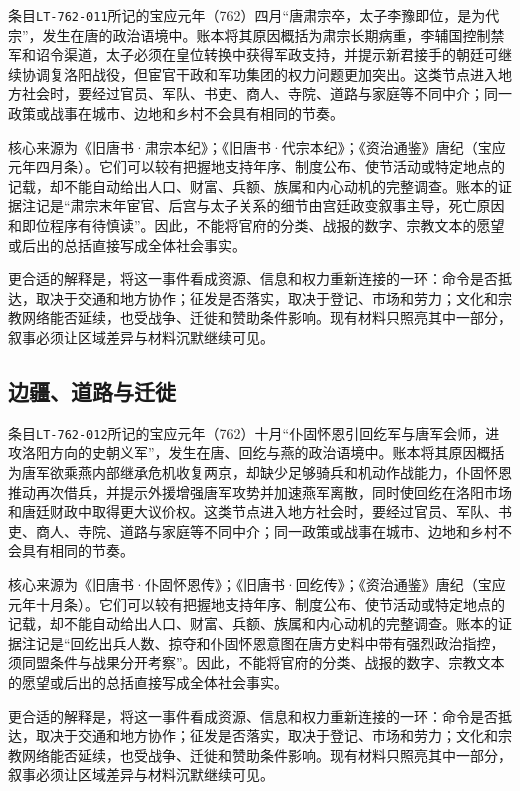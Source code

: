条目\texttt{LT-762-011}所记的宝应元年（762）四月“唐肃宗卒，太子李豫即位，是为代宗”，发生在唐的政治语境中。账本将其原因概括为肃宗长期病重，李辅国控制禁军和诏令渠道，太子必须在皇位转换中获得军政支持，并提示新君接手的朝廷可继续协调复洛阳战役，但宦官干政和军功集团的权力问题更加突出。这类节点进入地方社会时，要经过官员、军队、书吏、商人、寺院、道路与家庭等不同中介；同一政策或战事在城市、边地和乡村不会具有相同的节奏。

核心来源为《旧唐书·肃宗本纪》；《旧唐书·代宗本纪》；《资治通鉴》唐纪（宝应元年四月条）。它们可以较有把握地支持年序、制度公布、使节活动或特定地点的记载，却不能自动给出人口、财富、兵额、族属和内心动机的完整调查。账本的证据注记是“肃宗末年宦官、后宫与太子关系的细节由宫廷政变叙事主导，死亡原因和即位程序有待慎读”。因此，不能将官府的分类、战报的数字、宗教文本的愿望或后出的总括直接写成全体社会事实。

更合适的解释是，将这一事件看成资源、信息和权力重新连接的一环：命令是否抵达，取决于交通和地方协作；征发是否落实，取决于登记、市场和劳力；文化和宗教网络能否延续，也受战争、迁徙和赞助条件影响。现有材料只照亮其中一部分，叙事必须让区域差异与材料沉默继续可见。

\subsection{边疆、道路与迁徙}

条目\texttt{LT-762-012}所记的宝应元年（762）十月“仆固怀恩引回纥军与唐军会师，进攻洛阳方向的史朝义军”，发生在唐、回纥与燕的政治语境中。账本将其原因概括为唐军欲乘燕内部继承危机收复两京，却缺少足够骑兵和机动作战能力，仆固怀恩推动再次借兵，并提示外援增强唐军攻势并加速燕军离散，同时使回纥在洛阳市场和唐廷财政中取得更大议价权。这类节点进入地方社会时，要经过官员、军队、书吏、商人、寺院、道路与家庭等不同中介；同一政策或战事在城市、边地和乡村不会具有相同的节奏。

核心来源为《旧唐书·仆固怀恩传》；《旧唐书·回纥传》；《资治通鉴》唐纪（宝应元年十月条）。它们可以较有把握地支持年序、制度公布、使节活动或特定地点的记载，却不能自动给出人口、财富、兵额、族属和内心动机的完整调查。账本的证据注记是“回纥出兵人数、掠夺和仆固怀恩意图在唐方史料中带有强烈政治指控，须同盟条件与战果分开考察”。因此，不能将官府的分类、战报的数字、宗教文本的愿望或后出的总括直接写成全体社会事实。

更合适的解释是，将这一事件看成资源、信息和权力重新连接的一环：命令是否抵达，取决于交通和地方协作；征发是否落实，取决于登记、市场和劳力；文化和宗教网络能否延续，也受战争、迁徙和赞助条件影响。现有材料只照亮其中一部分，叙事必须让区域差异与材料沉默继续可见。


